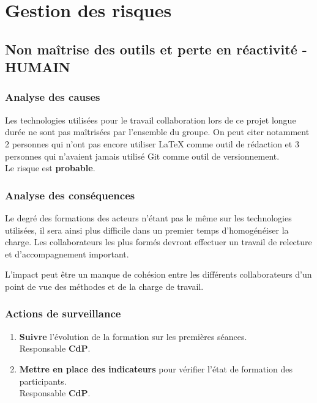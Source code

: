 \section{Gestion des risques}

\subsection{Non maîtrise des outils et perte en réactivité - HUMAIN}
\subsubsection{Analyse des causes}

Les technologies utilisées pour le travail collaboration lors de ce projet
longue durée ne sont pas maîtrisées par l'ensemble du groupe.
On peut citer notamment 2 personnes qui n'ont pas encore utiliser \LaTeX
comme outil de rédaction et 3 personnes qui n'avaient jamais utilisé Git
comme outil de versionnement.\\
Le risque est {\bf probable}.

\subsubsection{Analyse des conséquences}

Le degré des formations des acteurs n'étant pas le même sur les technologies
utilisées, il sera ainsi plus difficile dans un premier temps d'homogénéiser
la charge. Les collaborateurs les plus formés devront effectuer un travail de
relecture et d'accompagnement important. 

L'impact peut être un manque de cohésion entre les différents collaborateurs
d'un point de vue des méthodes et de la charge de travail.

\subsubsection{Actions de surveillance}

\begin{enumerate}
\item {\bf Suivre} l'évolution de la formation sur les premières séances.\\ 
Responsable {\bf CdP}.
\item {\bf Mettre en place des indicateurs} pour vérifier l'état de formation
des participants.\\
Responsable {\bf CdP}.
\end{enumerate}

